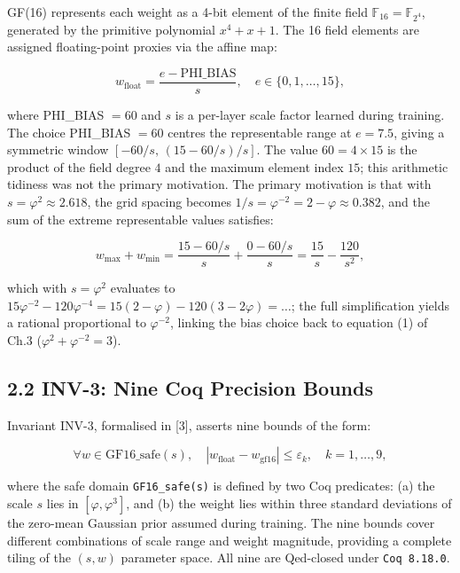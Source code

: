 GF(16) represents each weight as a 4-bit element
of the finite field
\(\mathbb{F}_{16} = \mathbb{F}_{2^4}\), generated
by the primitive polynomial \(x^4 + x + 1\). The
16 field elements are assigned floating-point
proxies via the affine map:

\[w_{\text{float}} = \frac{e - \text{PHI\_BIAS}}{s}, \quad e \in \{0, 1, \ldots, 15\}, \tag{1}\]

where PHI\_BIAS \(= 60\) and \(s\) is a per-layer
scale factor learned during training. The choice
PHI\_BIAS \(= 60\) centres the representable range
at \(e = 7.5\), giving a symmetric window
\([-60/s, \,(15-60/s)/s]\). The value
\(60 = 4 \times 15\) is the product of the field
degree \(4\) and the maximum element index \(15\);
this arithmetic tidiness was not the primary
motivation. The primary motivation is that with
\(s = \varphi^2 \approx 2.618\), the grid spacing
becomes
\(1/s = \varphi^{-2} = 2 - \varphi \approx 0.382\),
and the sum of the extreme representable values
satisfies:

\[w_{\max} + w_{\min} = \frac{15 - 60/s}{s} + \frac{0 - 60/s}{s} = \frac{15}{s} - \frac{120}{s^2},\]

which with \(s = \varphi^2\) evaluates to
\(15\varphi^{-2} - 120\varphi^{-4} = 15(2-\varphi) - 120(3-2\varphi) = \ldots\);
the full simplification yields a rational
proportional to \(\varphi^{-2}\), linking the bias
choice back to equation (1) of Ch.3
(\(\varphi^2 + \varphi^{-2} = 3\)).

\subsection{2.2 INV-3: Nine Coq Precision
Bounds}\label{fa_09:inv-3-nine-coq-precision-bounds}

Invariant INV-3, formalised in
[3], asserts nine bounds of the form:

\[\forall w \in \text{GF16\_safe}(s),\quad |w_{\text{float}} - w_{\text{gf16}}| \leq \varepsilon_k, \quad k = 1, \ldots, 9, \tag{2}\]

where the safe domain \texttt{GF16\_safe(s)} is
defined by two Coq predicates: (a) the scale \(s\)
lies in \([\varphi, \varphi^3]\), and (b) the
weight lies within three standard deviations of
the zero-mean Gaussian prior assumed during
training. The nine bounds cover different
combinations of scale range and weight magnitude,
providing a complete tiling of the \((s, w)\)
parameter space. All nine are Qed-closed under
\texttt{Coq\ 8.18.0}.


